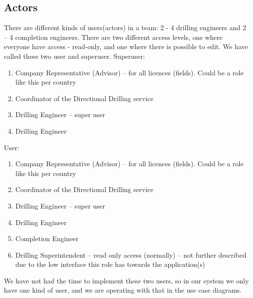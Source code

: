 \documentclass{report}
\begin{document}
\subsection{Actors} \label{subsec:actors}
There are different kinds of users(actors) in a team: 2 - 4 drilling engineers and 2 – 4 completion engineers. There are two different access levels, one where everyone have access - read-only, and one where there is possible to edit. We have called these two user and superuser.
Superuser:
\begin{enumerate}
    \item Company Representative (Advisor) – for all licences (fields). Could be a role like this per country
    \item Coordinator of the Directional Drilling service
    \item Drilling Engineer – super user
    \item Drilling Engineer
\end{enumerate}
User:
\begin{enumerate}
    \item Company Representative (Advisor) – for all licences (fields). Could be a role like this per country
    \item Coordinator of the Directional Drilling service
    \item Drilling Engineer – super user
    \item Drilling Engineer
    \item Completion Engineer
    \item Drilling Superintendent – read only access (normally) – not further described due to the low interface this role has towards the application(s)
\end{enumerate}
We have not had the time to implement these two users, so in our system we only have one kind of user, and we are operating with that in the use case diagrams.
\end{document}
